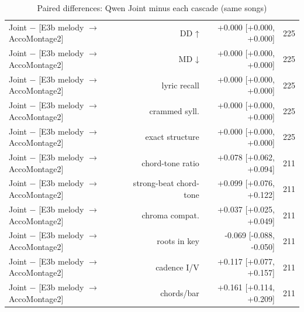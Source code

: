 \begin{table}[t]
\begin{tabular}{lrrr}
Joint $-$ [E3b melody $\rightarrow$ AccoMontage2] & DD ↑ & +0.000 [+0.000, +0.000] & 225 \\
Joint $-$ [E3b melody $\rightarrow$ AccoMontage2] & MD ↓ & +0.000 [+0.000, +0.000] & 225 \\
Joint $-$ [E3b melody $\rightarrow$ AccoMontage2] & lyric recall & +0.000 [+0.000, +0.000] & 225 \\
Joint $-$ [E3b melody $\rightarrow$ AccoMontage2] & crammed syll. & +0.000 [+0.000, +0.000] & 225 \\
Joint $-$ [E3b melody $\rightarrow$ AccoMontage2] & exact structure & +0.000 [+0.000, +0.000] & 225 \\
Joint $-$ [E3b melody $\rightarrow$ AccoMontage2] & chord-tone ratio & +0.078 [+0.062, +0.094] & 211 \\
Joint $-$ [E3b melody $\rightarrow$ AccoMontage2] & strong-beat chord-tone & +0.099 [+0.076, +0.122] & 211 \\
Joint $-$ [E3b melody $\rightarrow$ AccoMontage2] & chroma compat. & +0.037 [+0.025, +0.049] & 211 \\
Joint $-$ [E3b melody $\rightarrow$ AccoMontage2] & roots in key & -0.069 [-0.088, -0.050] & 211 \\
Joint $-$ [E3b melody $\rightarrow$ AccoMontage2] & cadence I/V & +0.117 [+0.077, +0.157] & 211 \\
Joint $-$ [E3b melody $\rightarrow$ AccoMontage2] & chords/bar & +0.161 [+0.114, +0.209] & 211 \\
\bottomrule
\end{tabular}
\caption{Paired differences: Qwen Joint minus each cascade (same songs)}
\label{tab:joint_vs_cascade_paired}
\end{table}
